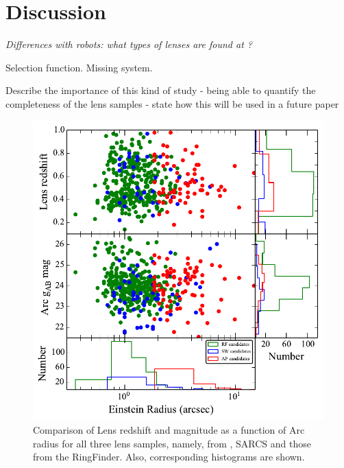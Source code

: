 \documentclass[useAMS,usenatbib,a4paper]{mn2e}
\begin{document}

\section{Discussion}
\label{sec:discuss}

{\it Differences with robots: what types of lenses are found at \sw?

Selection function. Missing system.

Describe the importance of this kind of study 
- being able to quantify the completeness of the lens samples
- state how this will be used in a future \sw paper }

\begin{figure}
\begin{center}
\includegraphics[scale=0.65]{sw-cfhtls-figs/zl_mg_re.pdf}
\caption{ \label{fig:zlre}
Comparison of Lens redshift and magnitude as a function of Arc radius for all three lens samples,
namely, from \sw, SARCS and those from the RingFinder. Also,
corresponding histograms are shown.}
\end{center}
\end{figure}
\end{document}
